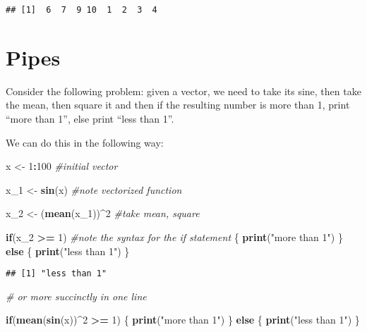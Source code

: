 \documentclass[]{article}
\newenvironment{Shaded}{\begin{snugshade}}{\end{snugshade}}
\newcommand{\KeywordTok}[1]{\textcolor[rgb]{0.13,0.29,0.53}{\textbf{#1}}}
\newcommand{\DecValTok}[1]{\textcolor[rgb]{0.00,0.00,0.81}{#1}}
\newcommand{\StringTok}[1]{\textcolor[rgb]{0.31,0.60,0.02}{#1}}
\newcommand{\CommentTok}[1]{\textcolor[rgb]{0.56,0.35,0.01}{\textit{#1}}}
\newcommand{\ControlFlowTok}[1]{\textcolor[rgb]{0.13,0.29,0.53}{\textbf{#1}}}
\newcommand{\OperatorTok}[1]{\textcolor[rgb]{0.81,0.36,0.00}{\textbf{#1}}}
\newcommand{\NormalTok}[1]{#1}
\begin{document}
\begin{verbatim}
## [1]  6  7  9 10  1  2  3  4
\end{verbatim}

\section{Pipes}\label{pipes}

Consider the following problem: given a vector, we need to take its
sine, then take the mean, then square it and then if the resulting
number is more than 1, print ``more than 1'', else print ``less than
1''.

We can do this in the following way:

\begin{Shaded}
\begin{Highlighting}[]
\NormalTok{x <-}\StringTok{ }\DecValTok{1}\OperatorTok{:}\DecValTok{100} \CommentTok{#initial vector}

\NormalTok{x_}\DecValTok{1}\NormalTok{ <-}\StringTok{ }\KeywordTok{sin}\NormalTok{(x) }\CommentTok{#note vectorized function}

\NormalTok{x_}\DecValTok{2}\NormalTok{ <-}\StringTok{ }\NormalTok{(}\KeywordTok{mean}\NormalTok{(x_}\DecValTok{1}\NormalTok{))}\OperatorTok{^}\DecValTok{2} \CommentTok{#take mean, square}

\ControlFlowTok{if}\NormalTok{(x_}\DecValTok{2} \OperatorTok{>=}\StringTok{ }\DecValTok{1}\NormalTok{) }\CommentTok{#note the syntax for the if statement}
\NormalTok{\{}
  \KeywordTok{print}\NormalTok{(}\StringTok{"more than 1"}\NormalTok{)}
\NormalTok{\} }\ControlFlowTok{else}
\NormalTok{\{}
  \KeywordTok{print}\NormalTok{(}\StringTok{"less than 1"}\NormalTok{)}
\NormalTok{\}}
\end{Highlighting}
\end{Shaded}

\begin{verbatim}
## [1] "less than 1"
\end{verbatim}

\begin{Shaded}
\begin{Highlighting}[]
\CommentTok{# or more succinctly in one line}

\ControlFlowTok{if}\NormalTok{(}\KeywordTok{mean}\NormalTok{(}\KeywordTok{sin}\NormalTok{(x))}\OperatorTok{^}\DecValTok{2} \OperatorTok{>=}\StringTok{ }\DecValTok{1}\NormalTok{)}
\NormalTok{\{}
  \KeywordTok{print}\NormalTok{(}\StringTok{"more than 1"}\NormalTok{)}
\NormalTok{\} }\ControlFlowTok{else}
\NormalTok{\{}
  \KeywordTok{print}\NormalTok{(}\StringTok{"less than 1"}\NormalTok{)}
\NormalTok{\}}
\end{Highlighting}
\end{Shaded}
\end{document}

